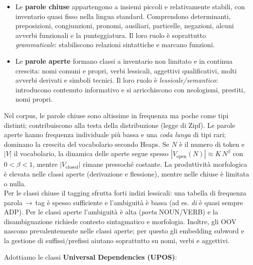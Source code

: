             \begin{itemize}
            
                \item Le \textbf{parole chiuse} appartengono a insiemi piccoli e relativamente stabili, con inventario quasi fisso nella lingua standard. Comprendono determinanti, preposizioni, congiunzioni, pronomi, ausiliari, particelle, negazioni, alcuni avverbi funzionali e la punteggiatura. Il loro ruolo è soprattutto \emph{grammaticale}: stabiliscono relazioni sintattiche e marcano funzioni.
                
                \item Le \textbf{parole aperte} formano classi a inventario non limitato e in continua crescita: nomi comuni e propri, verbi lessicali, aggettivi qualificativi, molti avverbi derivati e simboli tecnici. Il loro ruolo è \emph{lessicale/semantico}: introducono contenuto informativo e si arricchiscono con neologismi, prestiti, nomi propri.
                
            \end{itemize}
            
            Nel corpus, le parole chiuse sono altissime in frequenza ma poche come tipi distinti; contribuiscono alla testa della distribuzione (legge di Zipf). Le parole aperte hanno frequenza individuale più bassa e una \emph{coda lunga} di tipi rari; dominano la crescita del vocabolario secondo Heaps. Se $N$ è il numero di token e $|V|$ il vocabolario, la dinamica delle aperte segue spesso $|V_{\text{open}}(N)|\approx K\,N^{\beta}$ con $0<\beta<1$, mentre $|V_{\text{closed}}|$ rimane pressoché costante. La produttività morfologica è elevata nelle classi aperte (derivazione e flessione), mentre nelle chiuse è limitata o nulla.\\
            
            Per le classi chiuse il tagging sfrutta forti indizi lessicali: una tabella di frequenza parola\,$\to$\,tag è spesso sufficiente e l’ambiguità è bassa (ad es. \emph{di} è quasi sempre \textsc{ADP}). Per le classi aperte l’ambiguità è alta (\emph{porta} NOUN/VERB) e la disambiguazione richiede contesto sintagmatico e morfologia. Inoltre, gli OOV nascono prevalentemente nelle classi aperte; per questo gli embedding subword e la gestione di suffissi/prefissi aiutano soprattutto su nomi, verbi e aggettivi.

        \newpage
        
        Adottiamo le classi \textbf{Universal Dependencies (UPOS)}:         
        
